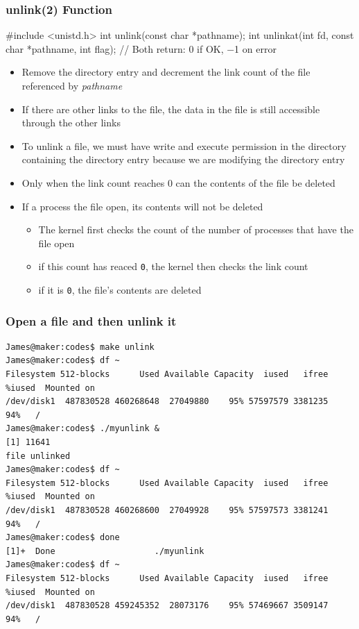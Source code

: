 \documentclass[newPxFont,sthlmFooter,nooffset]{beamer}
\begin{document}
\begin{frame}[containsverbatim,t]
  \frametitle{unlink(2) Function}
\begin{codedef}
#include <unistd.h>
int unlink(const char *pathname);
int unlinkat(int fd, const char *pathname, int flag);
// Both return: 0 if OK, −1 on error
\end{codedef}

{\footnotesize
\begin{itemize}
\item Remove the directory entry and decrement the link count of the file referenced by \textit{pathname}
\item If there are other links to the file, the data in the file is still accessible through the other links
\item To unlink a file, we must have write  and execute permission in the directory containing the directory entry because we are modifying the directory entry 
\item Only when the link count reaches 0 can the contents of the file be deleted
\item If a process the file open, its contents will not be deleted
  \begin{itemize}
  \item The kernel first checks the count of the number of processes that have the file open
  \item if this count has reaced \texttt{0}, the kernel then checks the link count
  \item if it is \texttt{0}, the file's contents are deleted
  \end{itemize}
\end{itemize}
}
\end{frame}

\begin{frame}[fragile]
  \frametitle{Open a file and then unlink it}
{\footnotesize
\begin{verbatim}
James@maker:codes$ make unlink
James@maker:codes$ df ~
Filesystem 512-blocks      Used Available Capacity  iused   ifree %iused  Mounted on
/dev/disk1  487830528 460268648  27049880    95% 57597579 3381235   94%   /
James@maker:codes$ ./myunlink &
[1] 11641
file unlinked
James@maker:codes$ df ~
Filesystem 512-blocks      Used Available Capacity  iused   ifree %iused  Mounted on
/dev/disk1  487830528 460268600  27049928    95% 57597573 3381241   94%   /
James@maker:codes$ done
[1]+  Done                    ./myunlink
James@maker:codes$ df ~
Filesystem 512-blocks      Used Available Capacity  iused   ifree %iused  Mounted on
/dev/disk1  487830528 459245352  28073176    95% 57469667 3509147   94%   /
\end{verbatim}
}
\end{frame}
\end{document}
